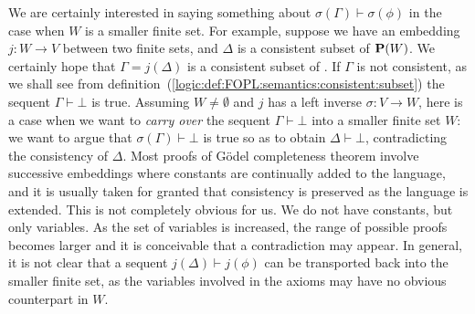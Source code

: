 We are certainly interested in saying something about
$\sigma(\Gamma)\vdash\sigma(\phi)$ in the case when $W$ is a smaller
finite set. For example, suppose we have an embedding $j:W\to V$
between two finite sets, and $\Delta$ is a consistent subset of
${\bf P}(W)$. We certainly hope that $\Gamma=j(\Delta)$ is a
consistent subset of \pv. If $\Gamma$ is not consistent, as we shall
see from
definition~(\ref{logic:def:FOPL:semantics:consistent:subset}) the
sequent $\Gamma\vdash\bot$ is true. Assuming $W\neq\emptyset$ and
$j$ has a left inverse $\sigma:V\to W$, here is a case when we want
to {\em carry over} the sequent $\Gamma\vdash\bot$ into a smaller
finite set $W$: we want to argue that $\sigma(\Gamma)\vdash\bot$ is
true so as to obtain $\Delta\vdash\bot$, contradicting the
consistency of $\Delta$. Most proofs of G\"odel completeness theorem
involve successive embeddings where constants are continually added
to the language, and it is usually taken for granted that
consistency is preserved as the language is extended. This is not
completely obvious for us. We do not have constants, but only
variables. As the set of variables is increased, the range of
possible proofs becomes larger and it is conceivable that a
contradiction may appear. In general, it is not clear that a sequent
$j(\Delta)\vdash j(\phi)$ can be transported back into the smaller
finite set, as the variables involved in the axioms may have no
obvious counterpart in $W$.

